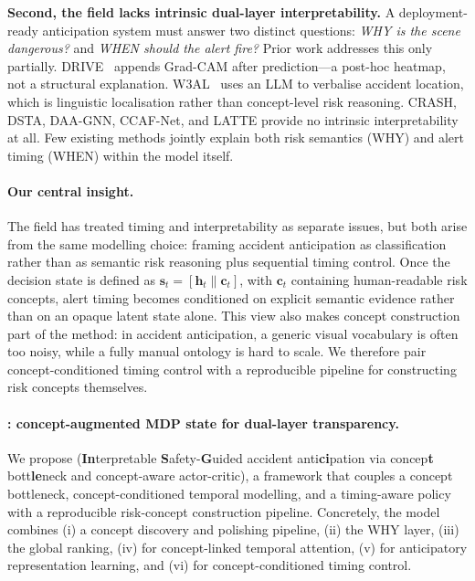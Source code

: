 \textbf{Second, the field lacks intrinsic dual-layer interpretability.}
A deployment-ready anticipation system must answer two distinct questions:
\emph{WHY is the scene dangerous?} and \emph{WHEN should the alert fire?}
Prior work addresses this only partially.
DRIVE~\citep{ref2} appends Grad-CAM after prediction---a post-hoc heatmap,
not a structural explanation.
W3AL~\citep{liao2024and} uses an LLM to verbalise accident location,
which is linguistic localisation rather than concept-level risk reasoning.
CRASH, DSTA, DAA-GNN, CCAF-Net, and LATTE provide no intrinsic
interpretability at all.
Few existing methods jointly explain both risk semantics (WHY)
and alert timing (WHEN) within the model itself.

\paragraph{Our central insight.}
The field has treated timing and interpretability as separate issues, but both
arise from the same modelling choice: framing accident anticipation as
classification rather than as semantic risk reasoning plus sequential timing
control. Once the decision state is defined as
$\mathbf{s}_t=[\mathbf{h}_t\|\mathbf{c}_t]$, with $\mathbf{c}_t$ containing
human-readable risk concepts, alert timing becomes conditioned on explicit
semantic evidence rather than on an opaque latent state alone. This view also
makes concept construction part of the method: in accident anticipation, a
generic visual vocabulary is often too noisy, while a fully manual ontology is
hard to scale. We therefore pair concept-conditioned timing control with a
reproducible pipeline for constructing risk concepts themselves.

\paragraph{\method{}: concept-augmented MDP state for dual-layer transparency.}
We propose \method{} (\textbf{In}terpretable \textbf{S}afety-\textbf{G}uided
accident anti\textbf{ci}pation via concep\textbf{t} bott\textbf{le}neck and
concept-aware actor-critic), a framework that couples a concept bottleneck,
concept-conditioned temporal modelling, and a timing-aware policy with a
reproducible risk-concept construction pipeline. Concretely, the model combines
(i) a concept discovery and polishing pipeline, (ii) the \cbm{} WHY layer,
(iii) the global \crs{} ranking, (iv) \cgta{} for concept-linked temporal
attention, (v) \tsd{} for anticipatory representation learning, and
(vi) \caac{} for concept-conditioned timing control.

